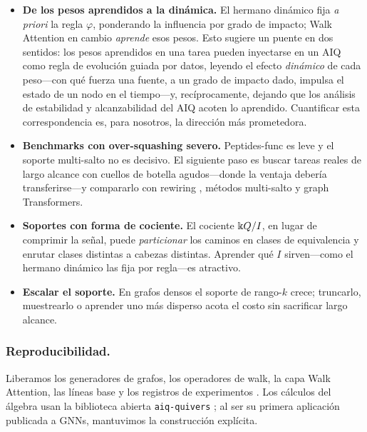 \begin{itemize}
  \item \textbf{De los pesos aprendidos a la dinámica.} El hermano dinámico
  \cite{zainea2026aiq} fija \emph{a priori} la regla $\varphi$, ponderando la
  influencia por grado de impacto; Walk Attention en cambio \emph{aprende} esos
  pesos. Esto sugiere un puente en dos sentidos: los pesos aprendidos en una tarea
  pueden inyectarse en un AIQ como regla de evolución guiada por datos, leyendo el
  efecto \emph{dinámico} de cada peso---con qué fuerza una fuente, a un grado de
  impacto dado, impulsa el estado de un nodo en el tiempo---y, recíprocamente,
  dejando que los análisis de estabilidad y alcanzabilidad del AIQ acoten lo
  aprendido. Cuantificar esta correspondencia es, para nosotros, la dirección más
  prometedora.
  \item \textbf{Benchmarks con over-squashing severo.} Peptides-func es leve y el
  soporte multi-salto no es decisivo. El siguiente paso es buscar tareas reales de
  largo alcance con cuellos de botella agudos---donde la ventaja debería
  transferirse---y compararlo con rewiring \cite{topping2022understanding},
  métodos multi-salto \cite{gutteridge2023drew} y graph Transformers.
  \item \textbf{Soportes con forma de cociente.} El cociente $\Bbbk Q/I$, en lugar de
  comprimir la señal, puede \emph{particionar} los caminos en clases de
  equivalencia y enrutar clases distintas a cabezas distintas. Aprender qué $I$
  sirven---como el hermano dinámico las fija por regla---es atractivo.
  \item \textbf{Escalar el soporte.} En grafos densos el soporte de rango-$k$
  crece; truncarlo, muestrearlo o aprender uno más disperso acota el costo sin
  sacrificar largo alcance.
\end{itemize}

\subsubsection*{Reproducibilidad.}
Liberamos los generadores de grafos, los operadores de walk, la capa Walk
Attention, las líneas base y los registros de experimentos
\cite{repo_walkattention}. Los cálculos del álgebra usan la biblioteca abierta
\texttt{aiq-quivers} \cite{repo_aiqquivers}; al ser su primera aplicación
publicada a GNNs, mantuvimos la construcción explícita.
